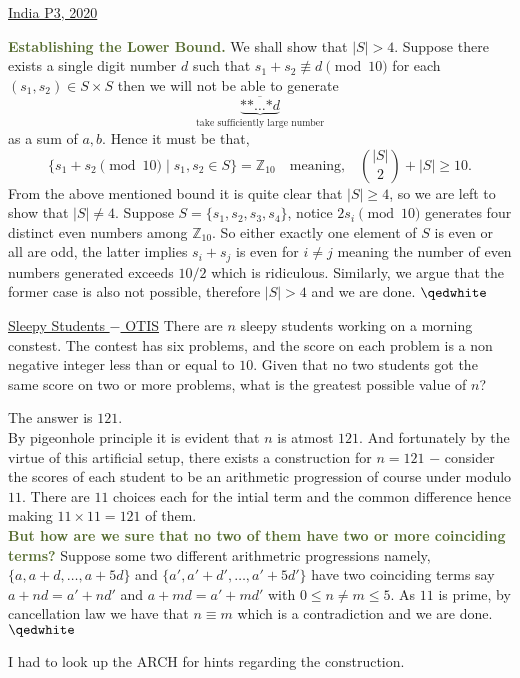 \begin{problem}{1}{\href{https://artofproblemsolving.com/community/c6h1989008p34732913}{India P3, 2020}}
\begin{solution}
	\noindent\textcolor{darkolivegreen}{\textbf{Establishing the Lower Bound.}} We shall show that $|S|>4$. Suppose there exists a single digit number $d$ such that $s_1+s_2\not\equiv d\pmod{10}$ for each $(s_1, s_2)\in S\times S$ then we will not be able to generate
$$\underbrace{\overline{\text{**}\ldots\text{*}d}}_{\text{take sufficiently large number}}$$as a sum of $a,b$. Hence it must be that,
$$\{s_1+s_2\pmod{10} \mid s_1,s_2\in S\}=\mathbb{Z}_{10}\quad\text{meaning,}\quad \binom{|S|}{2}+|S|\ge 10.$$From the above mentioned bound it is quite clear that $|S|\ge 4$, so we are left to show that $|S|\ne 4$. Suppose $S=\{s_1,s_2,s_3,s_4\}$, notice $2s_i\pmod {10}$ generates four distinct even numbers among $\mathbb{Z}_{10}$. So either exactly one element of $S$ is even or all are odd, the latter implies $s_i+s_j$ is even for $i\ne j$ meaning the number of even numbers generated exceeds $10/2$ which is ridiculous. Similarly, we argue that the former case is also not possible, therefore $|S|>4$ and we are done. $\qedwhite$

	\end{solution}
\end{problem}


\begin{problem}{2}{\href{https://otis.evanchen.cc/arch/SASHAOPT/}{Sleepy Students $-$ OTIS}}
	There are $n$ sleepy students working on a morning constest. The contest  has six problems, and the score on each problem is a non negative integer less than or equal to $10$. Given that no two students got the same score on two or more problems, what is the greatest possible value of $n$?
	\begin{solution} The answer is $121$.\\
	\indent By pigeonhole principle it is evident that $n$ is atmost $121$. And fortunately by the virtue of this artificial setup, there exists a construction for $n=121$ $-$ consider the scores of each student to be an arithmetic progression of course under modulo $11$. There are $11$ choices each for the intial term and the common difference hence making $11\times 11=121$ of them.\\
	
	\noindent\textbf{\textcolor{darkolivegreen}{But how are we sure that no two of them have two or more coinciding terms?}} Suppose some two different arithmetric progressions namely, $\{a, a+d, \ldots, a+5d\}$ and $\{a', a'+d', \ldots, a'+5d'\}$ have two coinciding terms say $a+nd=a'+nd'$ and $a+md=a'+md'$ with $0\le n\ne m\le 5$. As $11$ is prime, by cancellation law we have that $n\equiv m$ which is a contradiction and we are done. $\qedwhite$\\

	\begin{remark}[title=Confession.$\hspace{1mm}$] 
	I had to look up the ARCH for hints regarding the construction.
	\end{remark}
	\end{solution}
\end{problem}


